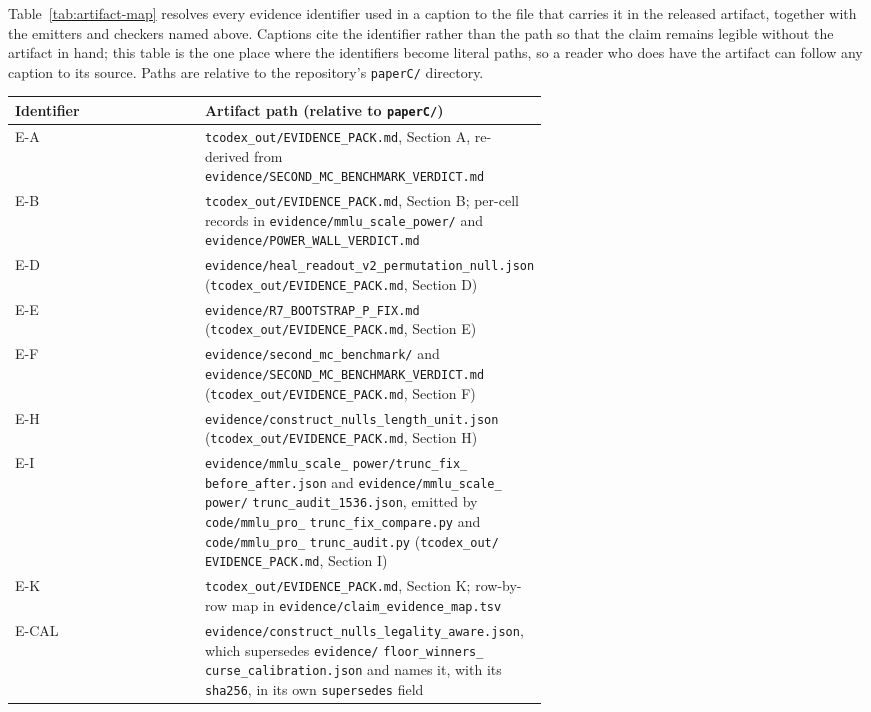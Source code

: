 Table~\ref{tab:artifact-map} resolves every evidence identifier used in a caption to the
file that carries it in the released artifact, together with the emitters and checkers named
above. Captions cite the identifier rather than the path so that the claim remains legible
without the artifact in hand; this table is the one place where the identifiers become
literal paths, so a reader who does have the artifact can follow any caption to its source.
Paths are relative to the repository's \texttt{paperC/} directory.

\begin{table}[t]
\centering
\small
\setlength{\tabcolsep}{4pt}
\begin{tabular}{lp{0.62\linewidth}}
\toprule
Identifier & Artifact path (relative to \texttt{paperC/}) \\
\midrule
\textsf{E-A} & \texttt{tcodex\_out/EVIDENCE\_PACK.md}, Section A, re-derived from \texttt{evidence/SECOND\_MC\_BENCHMARK\_VERDICT.md} \\
\textsf{E-B} & \texttt{tcodex\_out/EVIDENCE\_PACK.md}, Section B; per-cell records in \texttt{evidence/mmlu\_scale\_power/} and \texttt{evidence/POWER\_WALL\_VERDICT.md} \\
\textsf{E-D} & \texttt{evidence/heal\_readout\_v2\_permutation\_null.json} (\texttt{tcodex\_out/EVIDENCE\_PACK.md}, Section D) \\
\textsf{E-E} & \texttt{evidence/R7\_BOOTSTRAP\_P\_FIX.md} (\texttt{tcodex\_out/EVIDENCE\_PACK.md}, Section E) \\
\textsf{E-F} & \texttt{evidence/second\_mc\_benchmark/} and \texttt{evidence/SECOND\_MC\_BENCHMARK\_VERDICT.md} (\texttt{tcodex\_out/EVIDENCE\_PACK.md}, Section F) \\
\textsf{E-H} & \texttt{evidence/construct\_nulls\_length\_unit.json} (\texttt{tcodex\_out/EVIDENCE\_PACK.md}, Section H) \\
\textsf{E-I} & \texttt{evidence/mmlu\_scale\_} \texttt{power/trunc\_fix\_} \texttt{before\_after.json} and \texttt{evidence/mmlu\_scale\_} \texttt{power/} \texttt{trunc\_audit\_1536.json}, emitted by \texttt{code/mmlu\_pro\_} \texttt{trunc\_fix\_compare.py} and \texttt{code/mmlu\_pro\_} \texttt{trunc\_audit.py} (\texttt{tcodex\_out/} \texttt{EVIDENCE\_PACK.md}, Section I) \\
\textsf{E-K} & \texttt{tcodex\_out/EVIDENCE\_PACK.md}, Section K; row-by-row map in \texttt{evidence/claim\_evidence\_map.tsv} \\
\textsf{E-CAL} & \texttt{evidence/construct\_nulls\_legality\_aware.json}, which supersedes \texttt{evidence/} \texttt{floor\_winners\_} \texttt{curse\_calibration.json} and names it, with its \texttt{sha256}, in its own \texttt{supersedes} field \\

\end{tabular}
\end{table}
